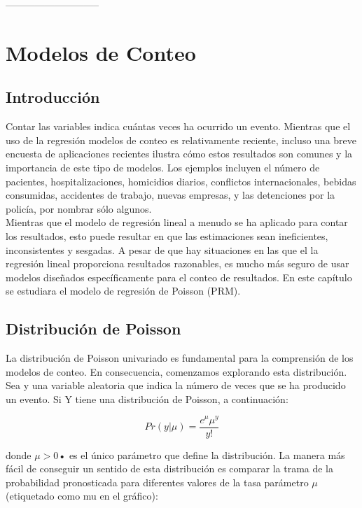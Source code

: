 \documentclass[11pt,fleqn]{book} %
\numberwithin{equation}{section} %
\numberwithin{figure}{section} %
\numberwithin{table}{section} %
\begin{document}
-----------------------------

\chapter{Modelos de Conteo}

\section{Introducción}
Contar las variables indica cuántas veces ha ocurrido un evento. Mientras que el uso de la regresión modelos de conteo es relativamente reciente, incluso una breve encuesta de aplicaciones recientes ilustra cómo estos resultados son comunes y la importancia de este tipo de modelos. Los ejemplos incluyen el número de pacientes, hospitalizaciones, homicidios diarios, conflictos internacionales, bebidas consumidas, accidentes de trabajo, nuevas empresas, y las detenciones por la policía, por nombrar sólo algunos.
\\
Mientras que el modelo de regresión lineal a menudo se ha aplicado para contar los resultados, esto puede resultar en que las estimaciones sean ineficientes, inconsistentes y sesgadas. A pesar de que hay situaciones en las que el la regresión lineal  proporciona resultados razonables, es mucho más seguro de usar modelos diseñados específicamente para el conteo de resultados. En este capítulo   se estudiara el modelo de  regresión de Poisson (PRM).

\section{Distribución de Poisson}

La distribución de Poisson univariado es fundamental para la comprensión de los modelos de conteo. En consecuencia, comenzamos explorando esta distribución. Sea y una variable aleatoria que indica la número de veces que se ha producido un evento. Si Y tiene una distribución de Poisson, a continuación:

\begin{equation}
Pr(y | \mu ) =\frac{{e}^{\mu }\mu^{y }}{y!}
\end{equation}

donde  $\mu> 0 $• es el único parámetro que define la distribución. La manera más fácil de conseguir un sentido de esta distribución es comparar la trama de la probabilidad pronosticada para diferentes valores de la tasa parámetro $\mu$ (etiquetado como mu en el gráfico):
\end{document}
